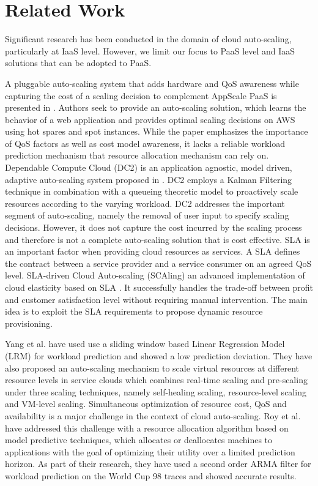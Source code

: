 \section{Related Work}
Significant research has been conducted in the domain of cloud auto-scaling, particularly at IaaS level. However, we limit our focus to PaaS level and IaaS solutions that can be adopted to PaaS.

A pluggable auto-scaling system that adds hardware and QoS awareness while capturing the cost of a scaling decision to complement AppScale PaaS is presented in \cite{Bunch_2012}. Authors seek to provide an auto-scaling solution, which learns the behavior of a web application and provides optimal scaling decisions on AWS using hot spares and spot instances. While the paper emphasizes the importance of QoS factors as well as cost model awareness, it lacks a reliable workload prediction mechanism that resource allocation mechanism can rely on. Dependable Compute Cloud (DC2) is an application agnostic, model driven, adaptive auto-scaling system proposed in \cite{modeldriven}. DC2 employs a Kalman Filtering technique in combination with a queueing theoretic model to proactively scale resources according to the varying workload. DC2 addresses the important segment of auto-scaling, namely the removal of user input to specify scaling decisions. However, it does not capture the cost incurred by the scaling process and therefore is not a complete auto-scaling solution that is cost effective. SLA is an important factor when providing cloud resources as services. A SLA defines the contract between a service provider and a service consumer on an agreed QoS level. SLA-driven Cloud Auto-scaling (SCAling) an advanced implementation of cloud elasticity based on SLA \cite{sladriven}. It successfully handles the trade-off between profit and customer satisfaction level without requiring manual intervention. The main idea is to exploit the SLA requirements to propose dynamic resource provisioning.

Yang et al. \cite{Yang_2013} have used use a sliding window based Linear Regression Model (LRM) for workload prediction and showed a low prediction deviation. They have also proposed an auto-scaling mechanism to scale virtual resources at different resource levels in service clouds which combines real-time scaling and pre-scaling under three scaling techniques, namely self-healing scaling, resource-level scaling and VM-level scaling. Simultaneous optimization of resource cost, QoS and availability is a major challenge in the context of cloud auto-scaling. Roy et al. \cite{Roy_2011} have addressed this challenge with a resource allocation algorithm based on model predictive techniques, which allocates or deallocates machines to applications with the goal of optimizing their utility over a limited prediction horizon. As part of their research, they have used a second order ARMA filter for workload prediction on the World Cup 98 traces \cite{WorldCup_1998} and showed accurate results.

